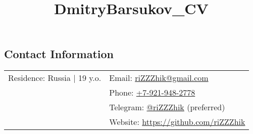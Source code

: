 \documentclass[margin,line]{res}
\begin{document}
\title{DmitryBarsukov_CV}

\begin{resume}

\section{\sc Contact Information}

\vspace{.05in}
\begin{tabular}{@{}p{2.30in}p{3in}}
Residence: Russia {|} 19 y.o.
& Email: \href{mailto:riZZZhik@gmail.com}{riZZZhik@gmail.com} \\
& Phone: \href{tel:+79219482778}{+7-921-948-2778} \\
& Telegram: \href{https://t.me/riZZZhik}{@riZZZhik} (preferred) \\
& Website: \href{https://github.com/riZZZhik}{https://github.com/riZZZhik} \\
\end{tabular}





\end{resume}
\end{document}
